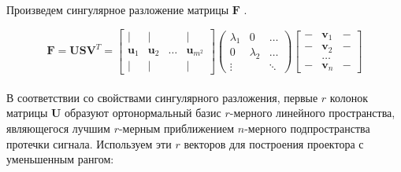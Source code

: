 Произведем сингулярное разложение матрицы $\mathbf{F}$ \cite{Golub1996}.

\begin{equation}
    \mathbf{F} = \mathbf{USV}^T
    =
    \begin{bmatrix}
        |            & |            &        & |       \\
        \mathbf{u}_1 & \mathbf{u}_2 & \dots  & \mathbf{u}_{m^2} \\
        |            & |            &        & |
    \end{bmatrix}
    \begin{pmatrix}
        \lambda_1 & 0         & \dots    \\
        0         & \lambda_2 & \dots    \\
        \vdots    &           & \ddots
    \end{pmatrix}
    \begin{bmatrix}
        - & \mathbf{v}_1 & - \\
        - & \mathbf{v}_2 & - \\
          & \dots        &   \\
        - & \mathbf{v}_n & -
    \end{bmatrix}
    \label{eq:svd_f_fixed_or}
\end{equation}
\\
В соответствии со свойствами сингулярного разложения, первые $r$ колонок матрицы $\mathbf{U}$
образуют ортонормальный базис $r$-мерного линейного пространства, являющегося лучшим $r$-мерным приближением $n$-мерного
подпространства протечки сигнала. Используем эти $r$ векторов для построения проектора с уменьшенным рангом:

